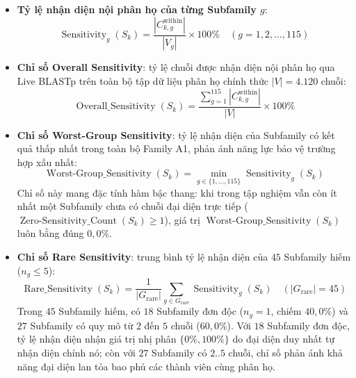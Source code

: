 \begin{itemize}
    \item \textbf{Tỷ lệ nhận diện nội phân họ của từng Subfamily $g$}:
    \begin{equation}
    \operatorname{Sensitivity}_g(S_k) = \frac{|C_{k, g}^{\text{within}}|}{|V_g|} \times 100\% \quad (g = 1, 2, \dots, 115)
    \end{equation}
    
    \item \textbf{Chỉ số Overall Sensitivity}: tỷ lệ chuỗi được nhận diện nội phân họ qua Live BLASTp trên toàn bộ tập dữ liệu phân họ chính thức $|V| = 4.120$ chuỗi:
    \begin{equation}
    \label{eq:overall_sens_formula}
    \operatorname{Overall\_Sensitivity}(S_k) = \frac{\sum_{g=1}^{115} |C_{k, g}^{\text{within}}|}{|V|} \times 100\%
    \end{equation}
    
    \item \textbf{Chỉ số Worst-Group Sensitivity}: tỷ lệ nhận diện của Subfamily có kết quả thấp nhất trong toàn bộ Family A1, phản ánh năng lực bảo vệ trường hợp xấu nhất:
    \begin{equation}
    \label{eq:worst_sens_formula}
    \operatorname{Worst\text{-}Group\_Sensitivity}(S_k) = \min_{g \in \{1, \dots, 115\}} \operatorname{Sensitivity}_g(S_k)
    \end{equation}
    Chỉ số này mang đặc tính hàm bậc thang: khi trong tập nghiệm vẫn còn ít nhất một Subfamily chưa có chuỗi đại diện trực tiếp ($\operatorname{Zero\text{-}Sensitivity\_Count}(S_k) \ge 1$), giá trị $\operatorname{Worst\text{-}Group\_Sensitivity}(S_k)$ luôn bằng đúng $0{,}0\%$.
    
    \item \textbf{Chỉ số Rare Sensitivity}: trung bình tỷ lệ nhận diện của $45$ Subfamily hiếm ($n_g \le 5$):
    \begin{equation}
    \label{eq:rare_sens_formula}
    \operatorname{Rare\_Sensitivity}(S_k) = \frac{1}{|G_{\text{rare}}|} \sum_{g \in G_{\text{rare}}} \operatorname{Sensitivity}_g(S_k) \quad (|G_{\text{rare}}| = 45)
    \end{equation}
    Trong $45$ Subfamily hiếm, có $18$ Subfamily đơn độc ($n_g = 1$, chiếm $40{,}0\%$) và $27$ Subfamily có quy mô từ $2$ đến $5$ chuỗi ($60{,}0\%$). Với $18$ Subfamily đơn độc, tỷ lệ nhận diện nhận giá trị nhị phân $\{0\%, 100\%\}$ do đại diện duy nhất tự nhận diện chính nó; còn với $27$ Subfamily có $2..5$ chuỗi, chỉ số phản ánh khả năng đại diện lan tỏa bao phủ các thành viên cùng phân họ.
    

\end{itemize}

